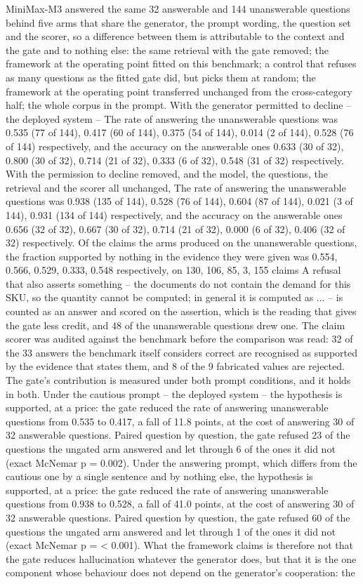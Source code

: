 \documentclass[preprint,3p,times]{elsarticle}
\begin{document}
MiniMax-M3 answered the same 32 answerable and 144 unanswerable questions behind five arms that share the generator, the prompt wording, the question set and the scorer, so a difference between them is attributable to the context and the gate and to nothing else: the same retrieval with the gate removed; the framework at the operating point fitted on this benchmark; a control that refuses as many questions as the fitted gate did, but picks them at random; the framework at the operating point transferred unchanged from the cross-category half; the whole corpus in the prompt. With the generator permitted to decline -- the deployed system -- The rate of answering the unanswerable questions was 0.535 (77 of 144), 0.417 (60 of 144), 0.375 (54 of 144), 0.014 (2 of 144), 0.528 (76 of 144) respectively, and the accuracy on the answerable ones 0.633 (30 of 32), 0.800 (30 of 32), 0.714 (21 of 32), 0.333 (6 of 32), 0.548 (31 of 32) respectively. With the permission to decline removed, and the model, the questions, the retrieval and the scorer all unchanged, The rate of answering the unanswerable questions was 0.938 (135 of 144), 0.528 (76 of 144), 0.604 (87 of 144), 0.021 (3 of 144), 0.931 (134 of 144) respectively, and the accuracy on the answerable ones 0.656 (32 of 32), 0.667 (30 of 32), 0.714 (21 of 32), 0.000 (6 of 32), 0.406 (32 of 32) respectively. Of the claims the arms produced on the unanswerable questions, the fraction supported by nothing in the evidence they were given was 0.554, 0.566, 0.529, 0.333, 0.548 respectively, on 130, 106, 85, 3, 155 claims A refusal that also asserts something -- the documents do not contain the demand for this SKU, so the quantity cannot be computed; in general it is computed as ... -- is counted as an answer and scored on the assertion, which is the reading that gives the gate less credit, and 48 of the unanswerable questions drew one. The claim scorer was audited against the benchmark before the comparison was read: 32 of the 33 answers the benchmark itself considers correct are recognised as supported by the evidence that states them, and 8 of the 9 fabricated values are rejected. The gate's contribution is measured under both prompt conditions, and it holds in both. Under the cautious prompt -- the deployed system -- the hypothesis is supported, at a price: the gate reduced the rate of answering unanswerable questions from 0.535 to 0.417, a fall of 11.8 points, at the cost of answering 30 of 32 answerable questions. Paired question by question, the gate refused 23 of the questions the ungated arm answered and let through 6 of the ones it did not (exact McNemar p = 0.002). Under the answering prompt, which differs from the cautious one by a single sentence and by nothing else, the hypothesis is supported, at a price: the gate reduced the rate of answering unanswerable questions from 0.938 to 0.528, a fall of 41.0 points, at the cost of answering 30 of 32 answerable questions. Paired question by question, the gate refused 60 of the questions the ungated arm answered and let through 1 of the ones it did not (exact McNemar p = < 0.001). What the framework claims is therefore not that the gate reduces hallucination whatever the generator does, but that it is the one component whose behaviour does not depend on the generator's cooperation: the 
\end{document}
